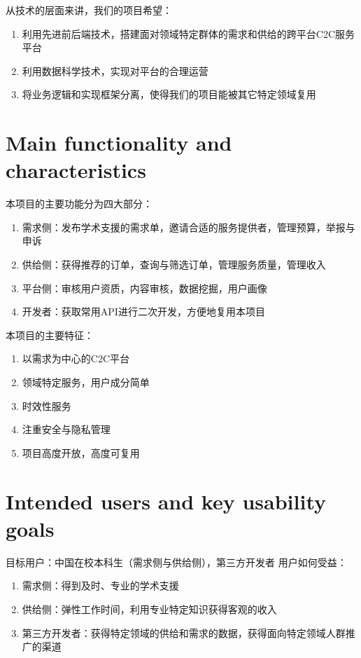 \documentclass[cn,black,10pt,normal]{elegantnote}
\begin{document}
从技术的层面来讲，我们的项目希望：
\begin{enumerate}
    \item 利用先进前后端技术，搭建面对领域特定群体的需求和供给的跨平台C2C服务平台
    \item 利用数据科学技术，实现对平台的合理运营
    \item 将业务逻辑和实现框架分离，使得我们的项目能被其它特定领域复用
\end{enumerate}

\section{Main functionality and characteristics}

本项目的主要功能分为四大部分：
\begin{enumerate}
    \item 需求侧：发布学术支援的需求单，邀请合适的服务提供者，管理预算，举报与申诉
    \item 供给侧：获得推荐的订单，查询与筛选订单，管理服务质量，管理收入
    \item 平台侧：审核用户资质，内容审核，数据挖掘，用户画像
    \item 开发者：获取常用API进行二次开发，方便地复用本项目
\end{enumerate}

本项目的主要特征：
\begin{enumerate}
    \item 以需求为中心的C2C平台
    \item 领域特定服务，用户成分简单
    \item 时效性服务
    \item 注重安全与隐私管理
    \item 项目高度开放，高度可复用
\end{enumerate}


\section{Intended users and key usability goals}

目标用户：中国在校本科生（需求侧与供给侧），第三方开发者
用户如何受益：
\begin{enumerate}
    \item 需求侧：得到及时、专业的学术支援
    \item 供给侧：弹性工作时间，利用专业特定知识获得客观的收入
    \item 第三方开发者：获得特定领域的供给和需求的数据，获得面向特定领域人群推广的渠道
\end{enumerate}
\end{document}
